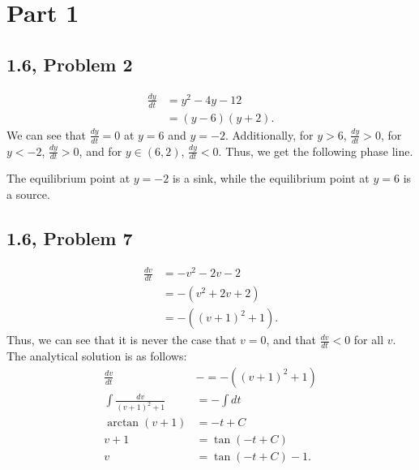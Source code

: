 \documentclass[10pt]{mypackage}
\begin{document}
\RaggedRight
\section{Part 1}%
\subsection{1.6, Problem 2}%
\begin{align*}
  \frac{dy}{dt} &= y^2 - 4y - 12\\
                &= \left(y-6\right)\left(y+2\right).
\end{align*}
We can see that $\frac{dy}{dt} = 0$ at $y=6$ and $y=-2$. Additionally, for $y > 6$, $\frac{dy}{dt} > 0$, for $y < -2$, $\frac{dy}{dt} > 0$, and for $y\in (6,2)$, $\frac{dy}{dt} < 0$. Thus, we get the following phase line.
\begin{center}
\end{center}
The equilibrium point at $y=-2$ is a sink, while the equilibrium point at $y=6$ is a source.
\subsection{1.6, Problem 7}%
\begin{align*}
  \frac{dv}{dt} &= -v^2 - 2v - 2\\
                &= -\left(v^2 + 2v + 2\right)\\
                &= -\left(\left(v+1\right)^2 + 1\right).
\end{align*}
Thus, we can see that it is never the case that $v = 0$, and that $\frac{dv}{dt} < 0$ for all $v$. The analytical solution is as follows:
\begin{align*}
  \frac{dv}{dt} &-= -\left(\left(v+1\right)^2 + 1\right)\\
  \int \frac{dv}{\left(v+1\right)^2 + 1} &= -\int dt\\
  \arctan\left(v+1\right) &= -t + C\\
  v+1 &= \tan\left(-t + C\right)\\
  v &= \tan\left(-t + C\right) - 1.
\end{align*}
\end{document}
